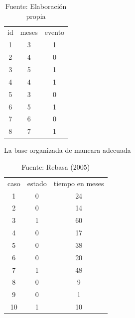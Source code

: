 \documentclass{beamer}
\begin{document}
\begin{frame}{}
\begin{table}[]
\centering
\begin{tabular}{ccc}
id & meses & evento \\
1  & 3     & 1      \\
2  & 4     & 0      \\
3  & 5     & 1      \\
4  & 4     & 1      \\
5  & 3     & 0      \\
6  & 5     & 1      \\
7  & 6     & 0      \\
8  & 7     & 1     
\end{tabular}
\caption{Fuente: Elaboración propia }
\label{tab:my-table}
\end{table}

\end{frame}

\begin{frame}

\begin{table}[]
\centering
{}
\caption{Estimador de kaplan Meier}
\label{tab:my-table}
\end{table}

\end{frame}





\begin{frame}{La base organizada de maneara adecuada}
\begin{table}[]
\centering
\begin{tabular}{ccc}
caso & estado & tiempo en meses \\
1    & 0      & 24              \\
2    & 0      & 14              \\
3    & 1      & 60              \\
4    & 0      & 17              \\
5    & 0      & 38              \\
6    & 0      & 20              \\
7    & 1      & 48              \\
8    & 0      & 9               \\
9    & 0      & 1               \\
10   & 1      & 10             
\end{tabular}
\caption{Fuente: Rebasa (2005)}
\label{tab:my-table}
\end{table}

\end{frame}
\end{document}
